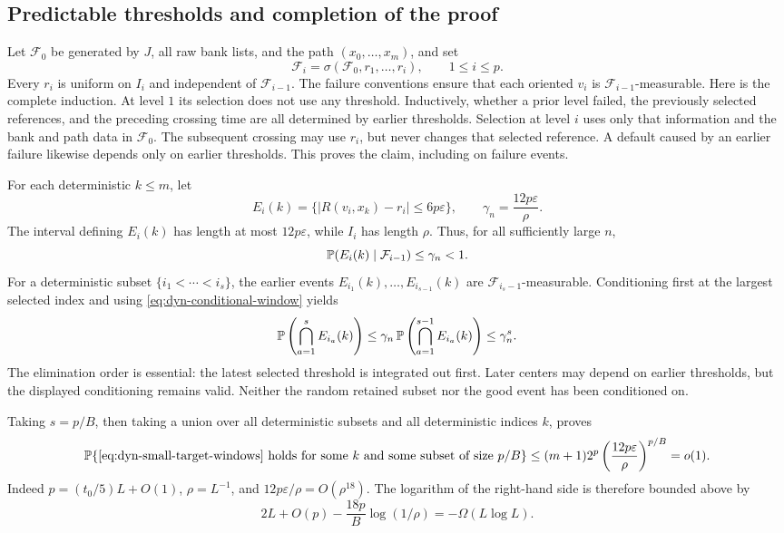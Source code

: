 \subsection{Predictable thresholds and completion of the proof}

Let $\mathcal F_0$ be generated by $J$, all raw bank lists, and the path
$(x_0,\ldots,x_m)$, and set
\[
 \mathcal F_i=\sigma(\mathcal F_0,r_1,\ldots,r_i),
 \qquad 1\leq i\leq p.
\]
Every $r_i$ is uniform on $I_i$ and independent of $\mathcal F_{i-1}$.
The failure conventions ensure that each oriented $v_i$ is
$\mathcal F_{i-1}$-measurable. Here is the complete induction. At level $1$ its
selection does not use any threshold. Inductively, whether a prior level
failed, the previously selected references, and the preceding crossing
time are all determined by earlier thresholds. Selection at level $i$
uses only that information and the bank and path data in $\mathcal F_0$.
The subsequent crossing may use $r_i$, but never changes that selected
reference. A default caused by an earlier failure likewise depends only
on earlier thresholds. This proves the claim, including on failure
events.

For each deterministic $k\leq m$, let
\[
 E_i(k)=\{|R(v_i,x_k)-r_i|\leq6p\varepsilon\},\qquad
 \gamma_n=\frac{12p\varepsilon}{\rho}.
\]
The interval defining $E_i(k)$ has length at most $12p\varepsilon$,
while $I_i$ has length $\rho$. Thus, for all sufficiently large $n$,
\begin{equation}\label{eq:dyn-conditional-window}
 \mathbb P(E_i(k)\mid\mathcal F_{i-1})\leq\gamma_n<1.
\end{equation}
For a deterministic subset $\{i_1<\cdots<i_s\}$, the earlier events
$E_{i_1}(k),\ldots,E_{i_{s-1}}(k)$ are
$\mathcal F_{i_s-1}$-measurable. Conditioning first at the largest
selected index and using \eqref{eq:dyn-conditional-window} yields
\[
 \mathbb P\left(\bigcap_{a=1}^s E_{i_a}(k)\right)
 \leq\gamma_n\,
 \mathbb P\left(\bigcap_{a=1}^{s-1}E_{i_a}(k)\right)
 \leq\gamma_n^s.
\]
The elimination order is essential: the latest selected threshold is
integrated out first. Later centers may depend on earlier thresholds,
but the displayed conditioning remains valid. Neither the random
retained subset nor the good event has been conditioned on.

Taking $s=p/B$, then taking a union over all deterministic subsets and all
deterministic indices $k$, proves
\begin{equation}\label{eq:dyn-threshold-union}
 \mathbb P\{\text{\eqref{eq:dyn-small-target-windows} holds for some }k
                  \text{ and some subset of size }p/B\}
 \leq(m+1)2^p\left(\frac{12p\varepsilon}{\rho}\right)^{p/B}
 =o(1).
\end{equation}
Indeed $p=(t_0/5)L+O(1)$, $\rho=L^{-1}$, and
$12p\varepsilon/\rho=O(\rho^{18})$. The logarithm of the right-hand
side is therefore bounded above by
\[
 2L+O(p)-\frac{18p}{B}\log(1/\rho)
       =-\Omega(L\log L).
\]

